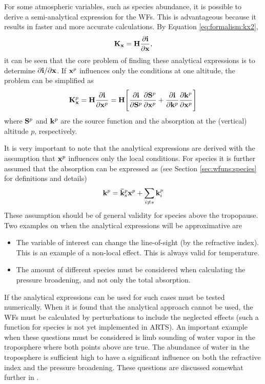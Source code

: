   \label{sec:wfuns:approaches:anal}
  For some atmospheric variables, such as species abundance, it is
  possible to derive a semi-analytical expression for the WFs. This is
  advantageous because it results in faster and more accurate
  calculations. By Equation \ref{eq:formalism:kx2},
  \begin{eqnarray*}
    \mathbf{K_x} = \mathbf{H}\frac{\partial\mathbf{i}}{\partial \mathbf{x}},
  \end{eqnarray*}
  it can be seen that the core problem of finding these analytical
  expressions is to determine $\partial\mathbf{i} / \partial \mathbf{x}$. 
  If $\mathbf{x}^p$ influences only the conditions at one altitude, the
  problem can be simplified as \citep[][Eq. 43]{eriksson:00a}
  \begin{equation}
    \mathbf{K}_{\mathbf{x}}^p = \mathbf{H} \frac{\partial\mathbf{i}}{\partial \mathbf{x}^p} = 
      \mathbf{H} \Bigg[ \frac{\partial\mathbf{i}}{\partial \mathbf{S}^p}
                 \frac{\partial \mathbf{S}^p}{\partial \mathbf{x}^p} +
                 \frac{\partial\mathbf{i}}{\partial \mathbf{k}^p}
                 \frac{\partial \mathbf{k}^p}{\partial \mathbf{x}^p} \Bigg]
   \label{eq:wfuns:taylor}
  \end{equation}
  where $\mathbf{S}^p$ and $\mathbf{k}^p$ are the source function and the
  absorption at the (vertical) altitude $p$, respectively.
  
  It is very important to note that the analytical expressions are
  derived with the assumption that $\mathbf{x}^p$ influences only the local
  conditions. For species it is further assumed that the absorption
  can be expressed as (see Section \ref{sec:wfuns:species} for
  definitions and details)
  \begin{equation}
   \mathbf{k}^p = \mathbf{\bar{k}}^p_s \mathbf{x}^p + \sum_{i\ne s} \mathbf{k}^p_i
  \end{equation}
  These assumption should be of general validity
  for species above the tropopause. Two examples on when the
  analytical expressions will be approximative are
  \begin{itemize}
  \item The variable of interest can change the line-of-sight (by the
    refractive index). This is an example of a non-local effect. This
    is always valid for temperature.
  \item The amount of different species must be considered when
    calculating the pressure broadening, and not only the total
    absorption.
  \end{itemize}
  If the analytical expressions can be used for such cases must be
  tested numerically. When it is found that the analytical approach
  cannot be used, the WFs must be calculated by perturbations to
  include the neglected effects (such a function for species is not
  yet implemented in ARTS). An important example when these questions
  must be considered is limb sounding of water vapor in the
  troposphere where both points above are true. The abundance of water
  in the troposphere is sufficient high to have a significant
  influence on both the refractive index and the pressure broadening.
  These questions are discussed somewhat further in \citet{eriksson:01d}.

